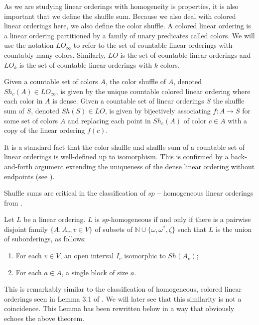 \documentclass[11pt]{amsart}
\theoremstyle{definition}
\begin{document}
As we are studying linear orderings with homogeneity is properties, it is also important that we define the shuffle sum.
Because we also deal with colored linear orderings here, we also define the color shuffle.
A colored linear ordering is a linear ordering partitioned by a family of unary predicates called colors.
We will use the notation $LO_\infty$ to refer to the set of countable linear orderings with countably many colors.
Similarly, $LO$ is the set of countable linear orderings and $LO_k$ is the set of countable linear orderings with $k$ colors.
\begin{definition}
    Given a countable set of colors $A$, the color shuffle of $A$, denoted $Sh_c(A)\in LO_\infty$, is given by the unique countable colored linear ordering where each color in $A$ is dense.
    Given a countable set of linear orderings $S$ the shuffle sum of $S$, denoted $Sh(S)\in LO$, is given by bijectively associating $f:A\to S$ for some set of colors $A$ and replacing each point in $Sh_c(A)$ of color $c\in A$ with a copy of the linear ordering $f(c)$.
\end{definition}
It is a standard fact that the color shuffle and shuffle sum of a countable set of linear orderings is well-defined up to isomorphism.
This is confirmed by a back-and-forth argument extending the uniqueness of the dense linear ordering without endpoints (see \cite[Chapter 7.3]{Ros}).

Shuffle sums are critical in the classification of $sp-$homogeneous linear orderings from \cite{CCGHN}.

\begin{theorem}\label{thm:homogChar}  Let $L$ be a linear ordering.
$L$ is $sp$-homogeneous if and only if there is a pairwise disjoint family $\{A,A_v, v \in V\}$ of subsets of $\mathbb N \cup \{\omega,\omega^*,\zeta\}$ such that $L$ is the union of suborderings, as follows: 

\begin{enumerate}
\item For each $v \in V$, an open interval $I_v$ isomorphic to $Sh(A_v)$;

\item For each $a \in A$, a single block of size $a$.
\end{enumerate}

\end{theorem} 

This is remarkably similar to the classification of homogeneous, colored linear orderings seen in Lemma 3.1 of \cite{ST08}.
We will later see that this similarity is not a coincidence.
This Lemma has been rewritten below in a way that obviously echoes the above theorem.
\end{document}
